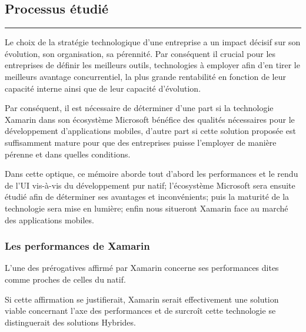 \documentclass[11]{article}
\begin{document}
\newpage
\thispagestyle{empty}
\strut



\newpage
\setcounter{page}{24}
\begin{center}
\part{Processus étudié}
\noindent\rule{12cm}{0.4pt}
\end{center}
\setcounter{section}{0}

Le choix de la stratégie technologique d’une entreprise a un impact décisif sur son évolution, son organisation, sa pérennité. Par conséquent il crucial pour les entreprises de définir les meilleurs outils, technologies à employer afin d’en tirer le meilleurs avantage concurrentiel, la plus grande rentabilité en fonction de leur capacité interne ainsi que de leur capacité d’évolution.

 \vspace{0.5cm}
 
Par conséquent, il est nécessaire de déterminer d’une part si la technologie Xamarin dans son écosystème Microsoft bénéfice des qualités nécessaires pour le développement d’applications mobiles, d’autre part si cette solution proposée est suffisamment mature pour que des entreprises puisse l’employer de manière pérenne et dans quelles conditions.
 
 \vspace{0.5cm}
 
Dans cette optique, ce mémoire aborde tout d’abord les performances et le rendu de l’UI vis-à-vis du développement pur natif; l’écosystème Microsoft sera ensuite étudié afin de déterminer ses avantages et inconvénients; puis la maturité de la technologie sera mise en lumière; enfin nous situeront Xamarin face au marché des applications mobiles.

 \vspace{0.5cm}
 

 \section{Les performances de Xamarin}
 
 L’une des prérogatives affirmé par Xamarin concerne ses performances dites comme proches de celles du natif.
 
  \vspace{0.5cm}
 
Si cette affirmation se justifierait, Xamarin serait effectivement une solution viable concernant l’axe des performances et de surcroît cette technologie se distinguerait des solutions Hybrides.
 
\end{document}
